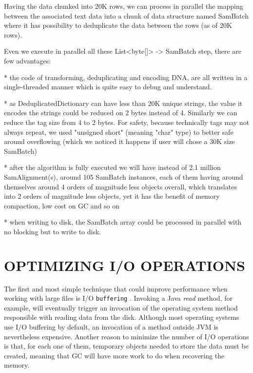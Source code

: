\documentclass[a4paper,twoside]{article}
\begin{document}
Having the data chunked into 20K rows, we can process in parallel the mapping between the associated text data into a chunk of data structure named SamBatch where it has possibility to deduplicate the data between the rows (as of 20K rows).

Even we execute in parallel all these List<byte[]> -> SamBatch step, there are few advantages:

* the code of transforming, deduplicating and encoding DNA, are all written in a single-threaded manner which is quite easy to debug and understand. 

* as DeduplicatedDictionary can have less than 20K unique strings, the value it encodes the strings could be reduced on 2 bytes instead of 4. Similarly we can reduce the tag size from 4 to 2 bytes. For safety, because technically tags may not always repeat, we used "unsigned short" (meaning "char" type) to better safe around overflowing (which we noticed it happens if user will chose a 30K size SamBatch)

* after the algorithm is fully executed we will have instead of 2.1 million SamAlignment(s), around 105 SamBatch instances, each of them having around themselves around 4 orders of magnitude less objects overall, which translates into 2 orders of magnitude less objects, yet it has the benefit of memory compaction, low cost on GC and so on

* when writing to disk, the SamBatch array could be processed in parallel with no blocking but to write to disk.

\section{\uppercase{Optimizing I/O Operations}}

The first and most simple technique that could improve performance when working with large files
is I/O {\tt buffering} \cite{oaks:2014}. Invoking a Java {\it read} method, for example, will eventually trigger an invocation of the operating system method responsible with reading data from the disk.
Although most operating systems use I/O buffering by default, an invocation of a method outside JVM is nevertheless expensive. Another reason to minimize the number of I/O operations is that, for each one of them, temporary objects needed to store the data must be created, meaning that GC will have more work to do when recovering the memory.
\end{document}
